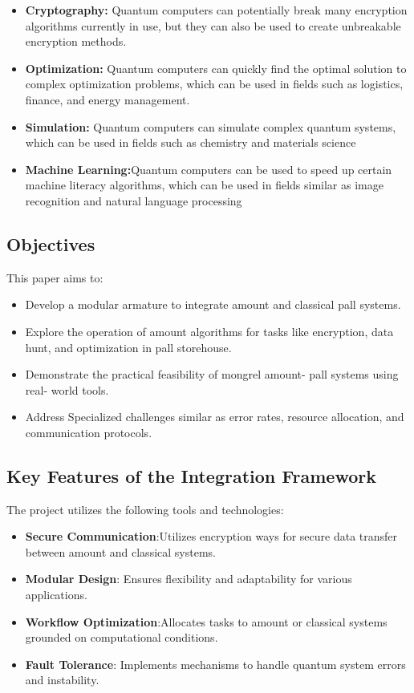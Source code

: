 \documentclass[conference]{IEEEtran}
\begin{document}
\begin{itemize}
\item \textbf{Cryptography:} Quantum computers can potentially break many encryption algorithms currently in
use, but they can also be used to create unbreakable encryption methods.
\item \textbf{Optimization:} Quantum computers can quickly find the optimal solution to complex
optimization problems, which can be used in fields such as logistics, finance, and energy management.
\item \textbf{Simulation:} Quantum computers can simulate complex quantum systems, which can be used in
fields such as chemistry and materials science
\item \textbf{Machine Learning:}Quantum computers can be used to speed up certain machine
literacy algorithms, which can be used in fields similar as image recognition and natural language processing
\end{itemize}


\subsection{Objectives}
This paper aims to:
\begin{itemize}
   \item  Develop a modular armature to integrate amount and classical  pall systems. 
   \item Explore the operation of amount algorithms for tasks like encryption, data hunt, and optimization in pall storehouse.
   \item  Demonstrate the practical feasibility of  mongrel amount-  pall systems using real- world tools. 
   \item  Address Specialized challenges similar as error rates, resource allocation, and communication protocols. 

\end{itemize}

\subsection{Key Features of the Integration Framework}
The project utilizes the following tools and technologies:
\begin{itemize}
    \item \textbf{Secure Communication}:Utilizes encryption ways for secure data transfer between amount and classical systems.
    \item \textbf{Modular Design}: Ensures flexibility and adaptability for various applications.
    \item \textbf{Workflow Optimization}:Allocates tasks to amount or classical systems grounded on computational conditions.
    \item \textbf{Fault Tolerance}: Implements mechanisms to handle quantum system errors and instability.
    
\end{itemize}
\end{document}
